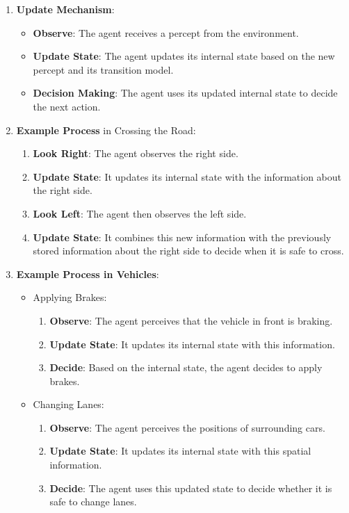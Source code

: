 \documentclass[
]{article}
\begin{document}
\begin{enumerate}
\def\labelenumi{\arabic{enumi}.}
\item
  \textbf{Update Mechanism}:

  \begin{itemize}
  \item
    \textbf{Observe}: The agent receives a percept from the environment.
  \item
    \textbf{Update State}: The agent updates its internal state based on
    the new percept and its transition model.
  \item
    \textbf{Decision Making}: The agent uses its updated internal state
    to decide the next action.
  \end{itemize}
\item
  \textbf{Example Process} in Crossing the Road:

  \begin{enumerate}
  \def\labelenumii{\arabic{enumii}.}
  \item
    \textbf{Look Right}: The agent observes the right side.
  \item
    \textbf{Update State}: It updates its internal state with the
    information about the right side.
  \item
    \textbf{Look Left}: The agent then observes the left side.
  \item
    \textbf{Update State}: It combines this new information with the
    previously stored information about the right side to decide when it
    is safe to cross.
  \end{enumerate}
\item
  \textbf{Example Process in Vehicles}:

  \begin{itemize}
  \item
    Applying Brakes:

    \begin{enumerate}
    \def\labelenumii{\arabic{enumii}.}
    \item
      \textbf{Observe}: The agent perceives that the vehicle in front is
      braking.
    \item
      \textbf{Update State}: It updates its internal state with this
      information.
    \item
      \textbf{Decide}: Based on the internal state, the agent decides to
      apply brakes.
    \end{enumerate}
  \item
    Changing Lanes:

    \begin{enumerate}
    \def\labelenumii{\arabic{enumii}.}
    \item
      \textbf{Observe}: The agent perceives the positions of surrounding
      cars.
    \item
      \textbf{Update State}: It updates its internal state with this
      spatial information.
    \item
      \textbf{Decide}: The agent uses this updated state to decide
      whether it is safe to change lanes.
    \end{enumerate}
  \end{itemize}
\end{enumerate}
\end{document}
